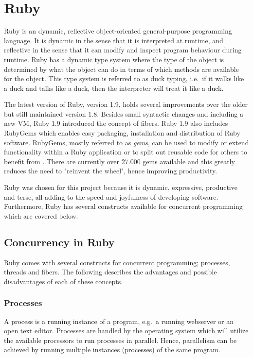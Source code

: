 \section{Ruby} %
\label{sec:ruby}

Ruby is an dynamic, reflective object-oriented general-purpose programming
language. It is dynamic in the sense that it is interpreted at runtime, and
reflective in the sense that it can modify and inspect program behaviour during
runtime.  Ruby has a dynamic type system where the type of the object is
determined by what the object can do in terms of which methods are available
for the object. This type system is referred to as duck typing, i.e.\ if it
walks like a duck and talks like a duck, then the interpreter will treat it
like a duck.

The latest version of Ruby, version 1.9, holds several improvements over the
older but still maintained version 1.8. Besides small syntactic changes and
including a new VM, Ruby 1.9 introduced the concept of fibers. Ruby 1.9 also
includes RubyGems which enables easy packaging, installation and distribution
of Ruby software. RubyGems, mostly referred to as \textit{gems}, can be used
to modify or extend functionality within a Ruby application or to split out
reusable code for others to benefit from \cite{rubygems}. There are currently
over 27.000 gems available and this greatly reduces the need to "reinvent the
wheel", hence improving productivity. 

Ruby was chosen for this project because it is dynamic, expressive, productive
and terse, all adding to the speed and joyfulness of developing software.
Furthermore, Ruby has several constructs available for concurrent programming
which are covered below.

\subsection{Concurrency in Ruby}
Ruby comes with several constructs for concurrent programming; processes, threads
and fibers. The following describes the advantages and possible disadvantages
of each of these concepts.

\subsubsection{Processes}
A process is a running instance of a program, e.g.\ a running webserver or an
open text editor. Processes are handled by the operating system which
will utilize the available processors to run processes in parallel.
Hence, parallelism can be achieved by running multiple instances (processes) of
the same program.

